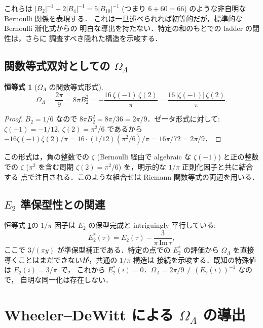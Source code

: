 \documentclass[11pt,a4paper]{article}
\newtheorem{identity}{恒等式}
\begin{document}
これらは $|B_2|^{-1} + 2|B_4|^{-1} = 5|B_{10}|^{-1}$ (つまり
$6 + 60 = 66$) のような非自明な Bernoulli 関係を表現する．
これは一旦述べられれば初等的だが，標準的な Bernoulli 漸化式からの
明白な導出を持たない．特定の和のもとでの ladder の閉性は，さらに
調査すべき隠れた構造を示唆する．

\subsection{関数等式双対としての $\Omega_\Lambda$}

\begin{identity}[$\Omega_\Lambda$ の関数等式形式]
\label{id:omega}
\begin{equation}
\Omega_\Lambda = \frac{2\pi}{9} = 8\pi B_2^2 = -\frac{16\,\zeta(-1)\,\zeta(2)}{\pi}
= \frac{16\,|\zeta(-1)|\,\zeta(2)}{\pi}.
\end{equation}
\end{identity}

\begin{proof}
$B_2 = 1/6$ なので $8\pi B_2^2 = 8\pi/36 = 2\pi/9$．ゼータ形式に対して:
$\zeta(-1) = -1/12$, $\zeta(2) = \pi^2/6$ であるから
$-16\zeta(-1)\zeta(2)/\pi = 16 \cdot (1/12)(\pi^2/6)/\pi = 16\pi/72 = 2\pi/9$．
\end{proof}

この形式は，負の整数での $\zeta$ (Bernoulli 経由で algebraic な
$\zeta(-1)$) と正の整数での $\zeta$ ($\pi^2$ を含む周期
$\zeta(2) = \pi^2/6$) を，明示的な $1/\pi$ 正則化因子と共に結合する
点で注目される．このような組合せは Riemann 関数等式の両辺を用いる．

\subsection{$E_2$ 準保型性との関連}

恒等式 \ref{id:omega}の $1/\pi$ 因子は $E_2$ の保型完成と intriguingly
平行している:
\begin{equation}
E_2^*(\tau) = E_2(\tau) - \frac{3}{\pi\,\mathrm{Im}\,\tau},
\end{equation}
ここで $3/(\pi y)$ が準保型補正である．特定の点での $E_2^*$ の評価から
$\Omega_\Lambda$ を直接導くことはまだできないが，共通の $1/\pi$ 構造は
接続を示唆する．既知の特殊値は $E_2(i) = 3/\pi$~\cite{Serre1973}で，
これから $E_2^*(i) = 0$．$\Omega_\Lambda = 2\pi/9 \neq (E_2(i))^{-1}$ なので，
自明な同一化は存在しない．

\section{Wheeler--DeWitt による $\Omega_\Lambda$ の導出}
\label{sec:wdw}
\end{document}

